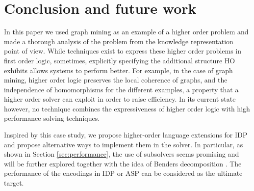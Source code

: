 \section{Conclusion and future work}
\label{sec:conclusion}
\vspace{-1em}
In this paper we used graph mining as an example of a higher order problem and made a thorough analysis of the problem from the knowledge representation point of view. While techniques exist to express these higher order problems in first order logic, sometimes, explicitly specifying the additional structure HO exhibits allows systems to perform better. For example, in the case of graph mining, higher order logic preserves the local coherence of graphs, and the independence of homomorphisms for the different examples, a property that a higher order solver can exploit in order to raise efficiency. In its current state however, no technique combines the expressiveness of higher order logic with high performance solving techniques. 

Inspired by this case study, we propose higher-order language extensions for IDP and propose alternative ways to implement them in the solver. In particular, as shown in Section \ref{sec:performance}, the use of subsolvers seems promising and will be further explored together with the idea of Benders decomposition \citep{Benders}. The performance of the encodings in IDP or ASP can be considered as the ultimate target. 
